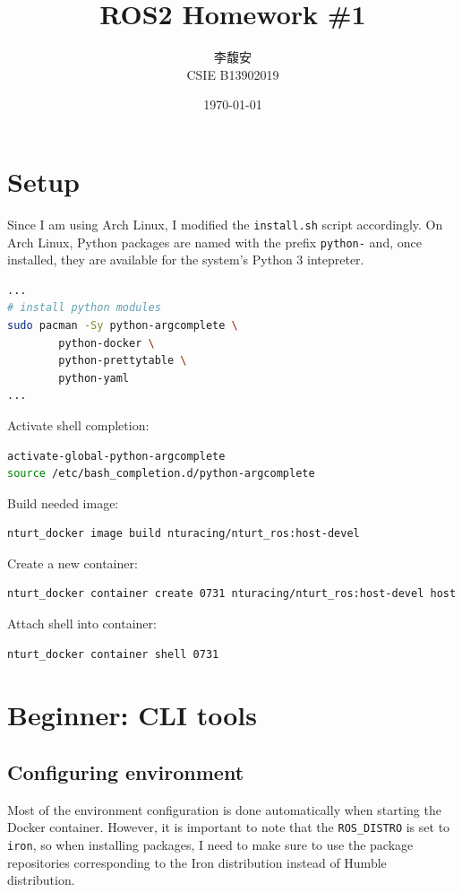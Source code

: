 \documentclass[12pt, a4paper]{article}
\title{\textbf{ROS2 Homework \#1}}
\author{李馥安 \\ CSIE B13902019}
\date{\today}
\begin{document}
\tableofcontents

\setcounter{section}{-1}
\maketitle
\section{Setup}
Since I am using Arch Linux, I modified the \texttt{install.sh} script accordingly. On Arch Linux, Python packages are named with the prefix \texttt{python-} and, once installed, they are available for the system's Python 3 intepreter.
\begin{lstlisting}[language=bash]
...
# install python modules
sudo pacman -Sy python-argcomplete \
		python-docker \
		python-prettytable \
		python-yaml
...
\end{lstlisting}
Activate shell completion:
\begin{lstlisting}[language=bash]
activate-global-python-argcomplete
source /etc/bash_completion.d/python-argcomplete
\end{lstlisting}
Build needed image:
\begin{lstlisting}[language=bash]
nturt_docker image build nturacing/nturt_ros:host-devel
\end{lstlisting}
Create a new container:
\begin{lstlisting}[language=bash]
nturt_docker container create 0731 nturacing/nturt_ros:host-devel host
\end{lstlisting}
Attach shell into container:
\begin{lstlisting}[language=bash]
nturt_docker container shell 0731
\end{lstlisting}

\newpage
\section{Beginner: CLI tools}
\subsection{Configuring environment}
Most of the environment configuration is done automatically when starting the Docker container. However, it is important to note that the \texttt{ROS\_DISTRO} is set to \texttt{iron}, so when installing packages, I need to make sure to use the package repositories corresponding to the Iron distribution instead of Humble distribution.
\end{document}
